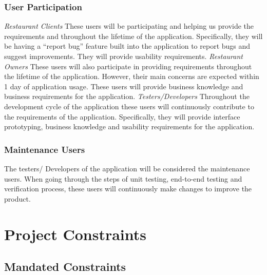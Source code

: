 \documentclass[12pt, titlepage]{article}
\begin{document}
\subsubsection{User Participation}
\textit{Restaurant Clients}\newline
These users will be participating and helping us provide the requirements and throughout the lifetime of the application. Specifically, they will be having a “report bug” feature built into the application to report bugs and suggest improvements. They will provide usability requirements.\newline
\newline
\textit{Restaurant Owners}\newline
These users will also participate in providing requirements throughout the lifetime of the application. However, their main concerns are expected within 1 day of application usage. These users will provide business knowledge and business requirements for the application.
\newline
\newline
\textit{Testers/Developers }\newline
Throughout the development cycle of the application these users will continuously contribute to the requirements of the application. Specifically, they will provide interface prototyping, business knowledge and usability requirements for  the application.
\newline
\newline

\subsubsection{Maintenance Users}
The testers/ Developers of the application will be considered the maintenance users. When going through the steps of unit testing, end-to-end testing and verification process, these users will continuously make changes to improve the product.

\section{Project Constraints}
\subsection{Mandated Constraints}
\end{document}
